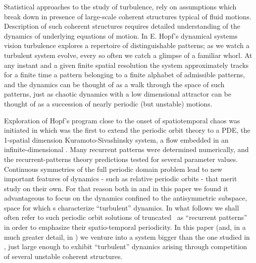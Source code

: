 


%

Statistical approaches to the study of turbulence,
rely on assumptions which break
down in presence of large-scale coherent structures typical
of fluid motions.
Description of such coherent structures requires detailed
understanding of the dynamics of underlying equations of
motion.
In E. Hopf's dynamical systems vision turbulence explores a
repertoire of distinguishable patterns; as we watch
a turbulent system evolve,
every so often we catch a glimpse of a familiar whorl. %
At any instant and a given finite spatial resolution the system
approximately tracks for a finite time a pattern belonging to a finite
alphabet of admissible patterns, and the dynamics can be thought of as a
walk through the space of such patterns, just as chaotic dynamics with a
low dimensional attractor can be thought of as a succession of nearly
periodic (but unstable) motions.

Exploration of Hopf's program close to the onset of
spatiotemporal chaos was initiated in
 which was the first to
extend the periodic orbit theory to a PDE,
the
1-spatial dimension Kuramoto-Sivashinsky system,
a flow embedded in
an infinite-dimensional \statesp.
Many recurrent patterns were determined
numerically, and the recurrent-patterns theory predictions tested for
several parameter values.
Continuous symmetries of the full periodic domain problem lead to
new important features of dynamics - such as relative periodic orbits -
that merit study on their own. For that reason
both in  and in this paper we found it advantageous to
focus on the dynamics confined to the
antisymmetric subspace, space for which \po s characterize
``turbulent'' dynamics.
In what follows we shall often refer to such periodic orbit solutions of
truncated \KSe\ as ``recurrent patterns'' in order to emphasize their
spatio-temporal periodicity.
In this paper
(and, in a much greater detail, in )
we venture into a {\KS} system bigger than the one
studied in , just large
enough to exhibit ``turbulent'' dynamics arising through
competition of several unstable coherent structures.

